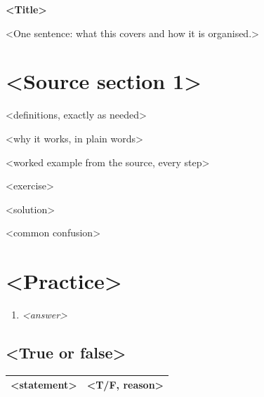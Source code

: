 \documentclass[11pt,a4paper]{article}
\begin{document}
{\LARGE\bfseries\sffamily\color{accent} <Title>}\par\smallskip
<One sentence: what this covers and how it is organised.>

\section{<Source section 1>}
\begin{defn}
<definitions, exactly as needed>
\end{defn}
\begin{idea}
<why it works, in plain words>
\end{idea}
\begin{exmpl}[: <name>]
<worked example from the source, every step>
\end{exmpl}
\begin{center}
\end{center}
\begin{task}
<exercise>
\end{task}
\sol <solution>
\begin{trap}
<common confusion>
\end{trap}

\section{<Practice>}
\begin{enumerate}
\item <exam-style problem> \hfill\textit{<answer>}
\end{enumerate}
\subsection*{<True or false>}
\begin{tabularx}{\linewidth}{Xl}\toprule
<statement> & <T/F, reason>\\\bottomrule
\end{tabularx}
\end{document}
